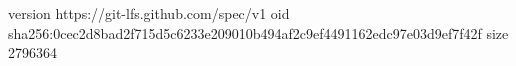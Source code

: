 version https://git-lfs.github.com/spec/v1
oid sha256:0cec2d8bad2f715d5c6233e209010b494af2c9ef4491162edc97e03d9ef7f42f
size 2796364
